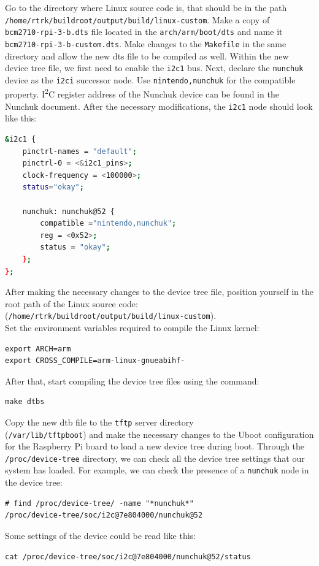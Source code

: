 \documentclass[11pt]{article}
\begin{document}
Go to the directory where Linux source code is, that should be in the path\\
\texttt{/home/rtrk/buildroot/output/build/linux-custom}. Make a copy of\\
\texttt{bcm2710-rpi-3-b.dts} file located in the \texttt{arch/arm/boot/dts} and
name it \texttt{bcm2710-rpi-3-b-custom.dts}. Make changes to the
\texttt{Makefile} in the same directory and allow the new dts file to be
compiled as well.
\newline
\newline
Within the new device tree file, we first need to enable the \texttt{i2c1} bus.
Next, declare the \texttt{nunchuk} device as the \texttt{i2ci} successor node.
Use \texttt{nintendo,nunchuk} for the compatible property. I\textsuperscript{2}C
register address of the Nunchuk device can be found in the Nunchuk document.
\newline
\newline
After the necessary modifications, the \texttt{i2c1} node should look like this:
\begin{lstlisting}[language=bash]
&i2c1 {
	pinctrl-names = "default";
	pinctrl-0 = <&i2c1_pins>;
	clock-frequency = <100000>;
	status="okay";

	nunchuk: nunchuk@52 {
		compatible ="nintendo,nunchuk";
		reg = <0x52>;
		status = "okay";
	};
};
\end{lstlisting}
After making the necessary changes to the device tree file, position yourself
in the root path of the Linux source code:\\
(\texttt{/home/rtrk/buildroot/output/build/linux-custom}).\\
Set the environment variables required to compile the Linux kernel:
\begin{lstlisting}
export ARCH=arm
export CROSS_COMPILE=arm-linux-gnueabihf-
\end{lstlisting}
After that, start compiling the device tree files using the command:
\begin{lstlisting}
make dtbs
\end{lstlisting}
Copy the new dtb file to the \texttt{tftp} server directory\\
(\texttt{/var/lib/tftpboot}) and make the necessary changes to the Uboot
configuration for the Raspberry Pi board to load a new device tree during boot.
\newline
\newline
Through the \texttt{/proc/device-tree} directory, we can check all the device
tree settings that our system has loaded.
\newline
For example, we can check the presence of a \texttt{nunchuk} node in the device
tree:
\begin{lstlisting}
# find /proc/device-tree/ -name "*nunchuk*"
/proc/device-tree/soc/i2c@7e804000/nunchuk@52
\end{lstlisting}
Some settings of the device could be read like this:
\begin{lstlisting}
cat /proc/device-tree/soc/i2c@7e804000/nunchuk@52/status
\end{lstlisting}
\end{document}
